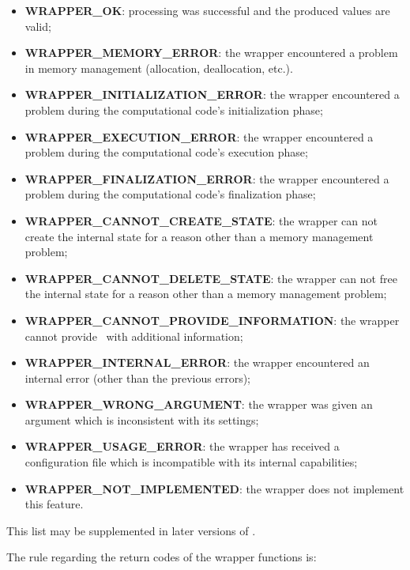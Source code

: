 \begin{itemize}
\item {\bf WRAPPER\_OK}: processing was successful and the produced values are valid;
\item {\bf WRAPPER\_MEMORY\_ERROR}: the wrapper encountered a problem in memory management (allocation, deallocation, etc.).
\item {\bf WRAPPER\_INITIALIZATION\_ERROR}: the wrapper encountered a problem during the computational code's initialization phase;
\item {\bf WRAPPER\_EXECUTION\_ERROR}: the wrapper encountered a problem during the computational code's execution phase;
\item {\bf WRAPPER\_FINALIZATION\_ERROR}: the wrapper encountered a problem during the computational code's finalization phase;
\item {\bf WRAPPER\_CANNOT\_CREATE\_STATE}: the wrapper can not create the internal state for a reason other than a memory management problem;
\item {\bf WRAPPER\_CANNOT\_DELETE\_STATE}: the wrapper can not free the internal state for a reason other than a memory management problem;
\item {\bf WRAPPER\_CANNOT\_PROVIDE\_INFORMATION}: the wrapper cannot provide \OT\ with additional information;
\item {\bf WRAPPER\_INTERNAL\_ERROR}: the wrapper encountered an internal error (other than the previous errors);
\item {\bf WRAPPER\_WRONG\_ARGUMENT}: the wrapper was given an argument which is inconsistent with its settings;
\item {\bf WRAPPER\_USAGE\_ERROR}: the wrapper has received a configuration file which is incompatible with its internal capabilities;
\item {\bf WRAPPER\_NOT\_IMPLEMENTED}: the wrapper does not implement this feature.
\end{itemize}

This list may be supplemented in later versions of \OT.

The rule regarding the return codes of the wrapper functions is:
\ \\
\ \\
\ \\


